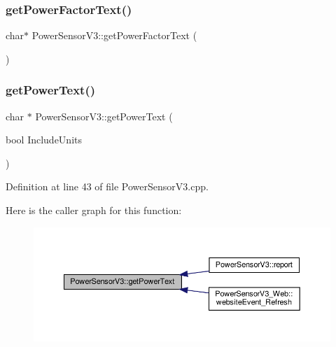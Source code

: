 \subsubsection{\texorpdfstring{get\+Power\+Factor\+Text()}{getPowerFactorText()}\hspace{0.1cm}{\footnotesize\ttfamily [2/2]}}
{\footnotesize\ttfamily char$\ast$ Power\+Sensor\+V3\+::get\+Power\+Factor\+Text (\begin{DoxyParamCaption}{ }\end{DoxyParamCaption})}

\mbox{\label{class_power_sensor_v3_a17c2031435f3ada2c531c41cdf58c629}} 
\subsubsection{\texorpdfstring{get\+Power\+Text()}{getPowerText()}\hspace{0.1cm}{\footnotesize\ttfamily [1/2]}}
{\footnotesize\ttfamily char $\ast$ Power\+Sensor\+V3\+::get\+Power\+Text (\begin{DoxyParamCaption}\item[{bool}]{Include\+Units }\end{DoxyParamCaption})}



Definition at line 43 of file Power\+Sensor\+V3.\+cpp.

Here is the caller graph for this function\+:
\nopagebreak
\begin{figure}[H]
\begin{center}
\leavevmode
\includegraphics[width=350pt]{class_power_sensor_v3_a17c2031435f3ada2c531c41cdf58c629_icgraph}
\end{center}
\end{figure}
\mbox{\label{class_power_sensor_v3_a3516af361f006c1bc23541c8b837d26c}} 
